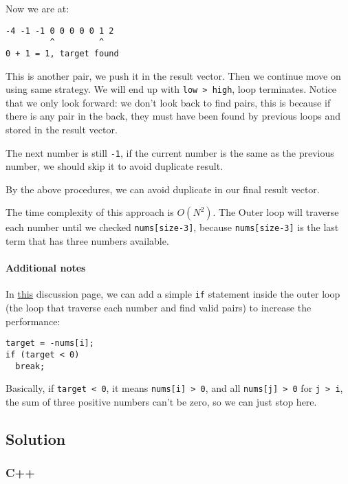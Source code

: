 \documentclass[11pt]{article}
\begin{document}
Now we are at:
\begin{Verbatim}[frame=single]
-4 -1 -1 0 0 0 0 0 1 2
         ^         ^  
0 + 1 = 1, target found
\end{Verbatim}
This is another pair, we push it in the result vector. Then we continue move on using same strategy. We will end up with \texttt{low > high}, loop terminates. Notice that we only look forward: we don't look back to find pairs, this is because if there is any pair in the back, they must have been found by previous loops and stored in the result vector.

The next number is still \texttt{-1}, if the current number is the same as the previous number, we should skip it to avoid duplicate result.

By the above procedures, we can avoid duplicate in our final result vector.

The time complexity of this approach is \(O(N^2)\). The Outer loop will traverse each number until we checked \texttt{nums[size-3]}, because \texttt{nums[size-3]} is the last term that has three numbers available.
\paragraph{Additional notes}
\label{sec:orgbed88ef}

In \href{https://leetcode.com/problems/3sum/discuss/7402/Share-my-AC-C++-solution-around-50ms-O(N*N)-with-explanation-and-comments}{this} discussion page, we can add a simple \texttt{if} statement inside the outer loop (the loop that traverse each number and find valid pairs) to increase the performance:
\begin{verbatim}
target = -nums[i];
if (target < 0)
  break;
\end{verbatim}
Basically, if \texttt{target < 0}, it means \texttt{nums[i] > 0}, and all \texttt{nums[j] > 0} for \texttt{j > i}, the sum of three positive numbers can't be zero, so we can just stop here.

\subsection{Solution}
\label{sec:org431c520}
\subsubsection{C++}
\label{sec:orgca37834}
\end{document}
